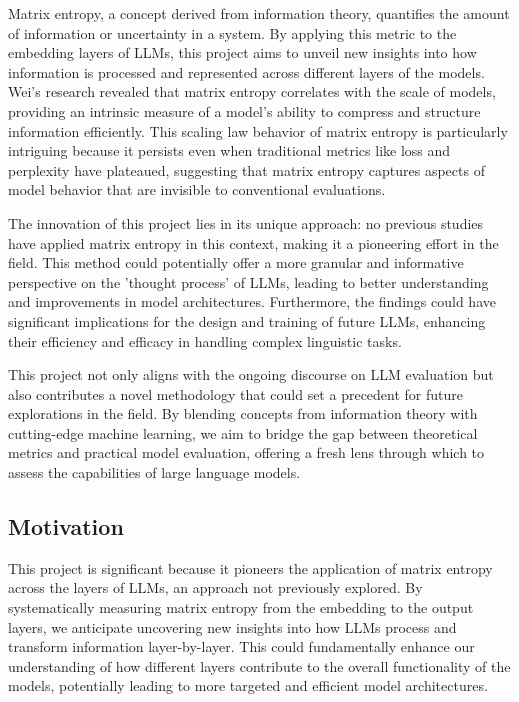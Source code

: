 \documentclass{article}
\begin{document}
Matrix entropy, a concept derived from information theory, quantifies the amount of information or uncertainty in a system. By applying this metric to the embedding layers of LLMs, this project aims to unveil new insights into how information is processed and represented across different layers of the models. Wei's research revealed that matrix entropy correlates with the scale of models, providing an intrinsic measure of a model's ability to compress and structure information efficiently. This scaling law behavior of matrix entropy is particularly intriguing because it persists even when traditional metrics like loss and perplexity have plateaued, suggesting that matrix entropy captures aspects of model behavior that are invisible to conventional evaluations.

The innovation of this project lies in its unique approach: no previous studies have applied matrix entropy in this context, making it a pioneering effort in the field. This method could potentially offer a more granular and informative perspective on the 'thought process' of LLMs, leading to better understanding and improvements in model architectures. Furthermore, the findings could have significant implications for the design and training of future LLMs, enhancing their efficiency and efficacy in handling complex linguistic tasks.

This project not only aligns with the ongoing discourse on LLM evaluation but also contributes a novel methodology that could set a precedent for future explorations in the field. By blending concepts from information theory with cutting-edge machine learning, we aim to bridge the gap between theoretical metrics and practical model evaluation, offering a fresh lens through which to assess the capabilities of large language models.

\subsection{Motivation}

This project is significant because it pioneers the application of matrix entropy across the layers of LLMs, an approach not previously explored. By systematically measuring matrix entropy from the embedding to the output layers, we anticipate uncovering new insights into how LLMs process and transform information layer-by-layer. This could fundamentally enhance our understanding of how different layers contribute to the overall functionality of the models, potentially leading to more targeted and efficient model architectures.
\end{document}
